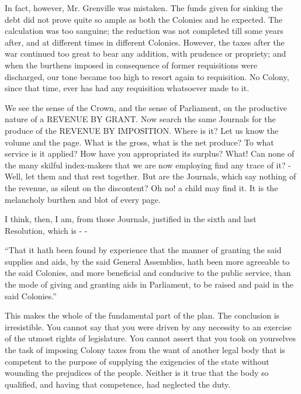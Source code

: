 In fact, however, Mr. Grenville was mistaken. The funds given for sinking the debt did not prove quite so ample as both the Colonies and he expected. The calculation was too sanguine; the reduction was not completed till some years after, and at different times in different Colonies. However, the taxes after the war continued too great to bear any addition, with prudence or propriety; and when the burthens imposed in consequence of former requisitions were discharged, our tone became too high to resort again to requisition. No Colony, since that time, ever has had any requisition whatsoever made to it.\par

We see the sense of the Crown, and the sense of Parliament, on the productive nature of a REVENUE BY GRANT. Now search the same Journals for the produce of the REVENUE BY IMPOSITION. Where is it? Let us know the volume and the page. What is the gross, what is the net produce? To what service is it applied? How have you appropriated its surplus? What! Can none of the many skilful index-makers that we are now employing find any trace of it? - Well, let them and that rest together. But are the Journals, which say nothing of the revenue, as silent on the discontent? Oh no! a child may find it. It is the melancholy burthen and blot of every page.\par

I think, then, I am, from those Journals, justified in the sixth and last Resolution, which is - -\par

“That it hath been found by experience that the manner of granting the said supplies and aids, by the said General Assemblies, hath been more agreeable to the said Colonies, and more beneficial and conducive to the public service, than the mode of giving and granting aids in Parliament, to be raised and paid in the said Colonies.”\par

This makes the whole of the fundamental part of the plan. The conclusion is irresistible. You cannot say that you were driven by any necessity to an exercise of the utmost rights of legislature. You cannot assert that you took on yourselves the task of imposing Colony taxes from the want of another legal body that is competent to the purpose of supplying the exigencies of the state without wounding the prejudices of the people. Neither is it true that the body so qualified, and having that competence, had neglected the duty.\par

